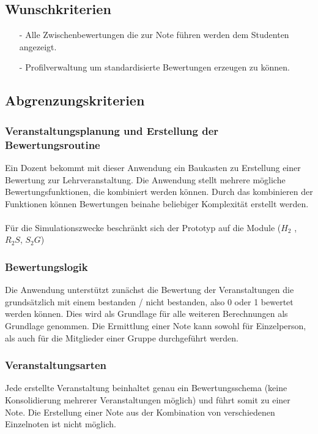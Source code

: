 			
		\subsection{Wunschkriterien}
		\begin{itemize}
		\item[-]	Alle Zwischenbewertungen die zur Note führen werden dem Studenten angezeigt.
		\item[-]	Profilverwaltung um standardisierte Bewertungen erzeugen zu können.
		\end{itemize}
		
		\subsection{Abgrenzungskriterien}
		\subsubsection*{Veranstaltungsplanung und Erstellung der Bewertungsroutine}
		
		Ein Dozent bekommt mit dieser Anwendung ein  Baukasten zu Erstellung einer Bewertung zur Lehrveranstaltung. Die Anwendung stellt mehrere mögliche Bewertungsfunktionen, die kombiniert werden können. Durch das kombinieren der Funktionen können Bewertungen beinahe beliebiger Komplexität erstellt werden.\\
		\\		
		Für die Simulationszwecke beschränkt sich der Prototyp auf die Module ($H_2$ , $R_2S$, $S_2G$)
		
		\subsubsection*{Bewertungslogik}
		
		Die Anwendung unterstützt zunächst die Bewertung der Veranstaltungen die grundsätzlich mit einem bestanden / nicht bestanden, also 0 oder 1 bewertet werden können. Dies wird als Grundlage für alle weiteren Berechnungen als Grundlage genommen. Die Ermittlung einer Note kann sowohl für Einzelperson, als auch für die Mitglieder einer Gruppe durchgeführt werden. 

		\subsubsection*{Veranstaltungsarten}
		
		Jede erstellte Veranstaltung beinhaltet genau ein Bewertungsschema (keine Konsolidierung mehrerer Veranstaltungen möglich) und führt somit zu einer Note. Die Erstellung einer Note aus der Kombination von verschiedenen Einzelnoten ist nicht möglich.

